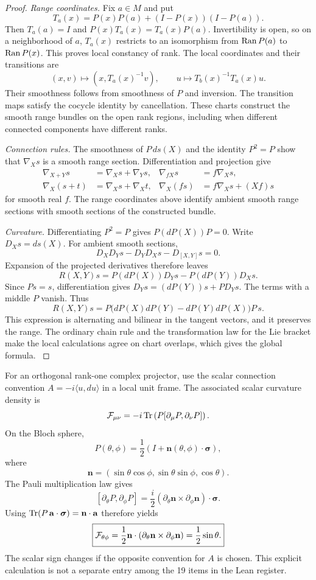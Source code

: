 \begin{proof}\label{core:proof:013}
\textit{Range coordinates.} Fix $a\in M$ and put
\[
T_a(x)=P(x)P(a)+(I-P(x))(I-P(a)).
\]
Then $T_a(a)=I$ and $P(x)T_a(x)=T_a(x)P(a)$. Invertibility is open, so on a neighborhood of $a$, $T_a(x)$ restricts to an isomorphism from $\operatorname{Ran} P(a)$ to $\operatorname{Ran} P(x)$. This proves local constancy of rank. The local coordinates and their transitions are
\[
(x,v)\longmapsto (x,T_a(x)^{-1}v),\qquad
u\longmapsto T_b(x)^{-1}T_a(x)u.
\]
Their smoothness follows from smoothness of $P$ and inversion. The transition maps satisfy the cocycle identity by cancellation. These charts construct the smooth range bundles on the open rank regions, including when different connected components have different ranks.

\textit{Connection rules.} The smoothness of $P\,ds(X)$ and the identity $P^2=P$ show that $\nabla_Xs$ is a smooth range section. Differentiation and projection give
\[
\begin{aligned}
\nabla_{X+Y}s&=\nabla_Xs+\nabla_Ys,&
\nabla_{fX}s&=f\nabla_Xs,\\
\nabla_X(s+t)&=\nabla_Xs+\nabla_Xt,&
\nabla_X(fs)&=f\nabla_Xs+(Xf)s
\end{aligned}
\]
for smooth real $f$. The range coordinates above identify ambient smooth range sections with smooth sections of the constructed bundle.

\textit{Curvature.} Differentiating $P^2=P$ gives $P(dP(X))P=0$. Write $D_Xs=ds(X)$. For ambient smooth sections,
\[
D_XD_Ys-D_YD_Xs-D_{[X,Y]}s=0.
\]
Expansion of the projected derivatives therefore leaves
\[
R(X,Y)s=P(dP(X))D_Ys-P(dP(Y))D_Xs.
\]
Since $Ps=s$, differentiation gives $D_Ys=(dP(Y))s+PD_Ys$. The terms with a middle $P$ vanish. Thus
\[
R(X,Y)s=P\bigl(dP(X)dP(Y)-dP(Y)dP(X)\bigr)P\,s.
\]
This expression is alternating and bilinear in the tangent vectors, and it preserves the range. The ordinary chain rule and the transformation law for the Lie bracket make the local calculations agree on chart overlaps, which gives the global formula.
\label{core:proof:013:end}\end{proof}

For an orthogonal rank-one complex projector, use the scalar connection convention $A=-i\langle u,du\rangle$ in a local unit frame. The associated scalar curvature density is
\[
\cF_{\mu\nu}
=-i\Tr\left(P[\partial_\mu P,\partial_\nu P]\right).
\]
On the Bloch sphere,
\[
P(\theta,\phi)
=
\frac12\left(I+\mathbf n(\theta,\phi)\cdot\boldsymbol\sigma\right),
\]
where
\[
\mathbf n=(\sin\theta\cos\phi,\sin\theta\sin\phi,\cos\theta).
\]
The Pauli multiplication law gives
\[
[\partial_\theta P,\partial_\phi P]
=\frac{i}{2}(\partial_\theta\mathbf n\mathbin{\times}\partial_\phi\mathbf n)\cdot\boldsymbol\sigma.
\]
Using $\Tr(P\,\mathbf a\cdot\boldsymbol\sigma)=\mathbf n\cdot\mathbf a$ therefore yields
\[
\boxed{\cF_{\theta\phi}
=\frac12\mathbf n\cdot(\partial_\theta\mathbf n\mathbin{\times}\partial_\phi\mathbf n)
=\frac12\sin\theta.}
\]
The scalar sign changes if the opposite convention for $A$ is chosen. This explicit calculation is not a separate entry among the 19 items in the Lean register.

